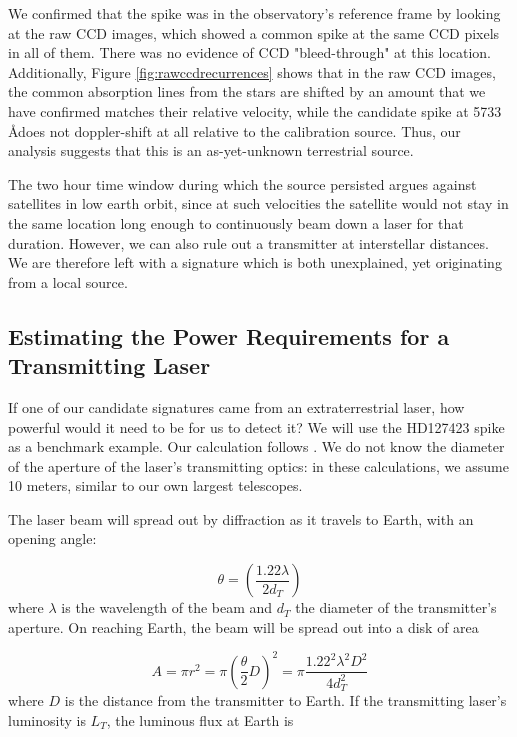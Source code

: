 \documentclass[linenumbers]{aastex631}
\begin{document}
 We confirmed that the spike was in the observatory's reference frame by looking at the raw CCD images, which showed a common spike at the same CCD pixels in all of them.  There was no evidence of CCD "bleed-through" at this location.
Additionally, Figure \ref{fig:rawccdrecurrences} shows that in the raw CCD images, the common absorption lines from the stars are shifted by an amount that we have confirmed matches their relative velocity, while the candidate spike at 5733 \AA does not doppler-shift at all relative to the calibration source. 
 Thus, our analysis suggests that this is an as-yet-unknown terrestrial source.

The two hour time window during which the source persisted argues against satellites in low earth orbit, since at such velocities the satellite would not stay in the same location long enough to continuously beam down a laser for that duration. However, we can also rule out a transmitter at interstellar distances. We are therefore left with a signature which is both unexplained, yet originating from a local source.

\subsection{Estimating the Power Requirements for a Transmitting Laser}
If one of our candidate signatures came from an extraterrestrial laser, how powerful would it need to be for us to detect it?  We will use the HD127423 spike as a benchmark example.  Our calculation follows \cite{Lipman_2019}.  We do not know the diameter of the aperture of the laser’s transmitting optics: in these calculations, we assume 10 meters, similar to our own largest telescopes.

The laser beam will spread out by diffraction as it travels to Earth, with an opening angle:

\begin{equation}
    \theta = (\frac{1.22\lambda}{2d_T})
\end{equation}
where $\lambda$ is the wavelength of the beam and $d_T$ the diameter of the transmitter's aperture.  On reaching Earth, the beam will be spread out into a disk of area

\begin{equation}
    A = \pi r^2 = \pi (\frac{\theta}{2} D)^2 = \pi \frac{1.22^2 \lambda^2 D^2}{4 d_T^2}
\end{equation}
where $D$ is the distance from the transmitter to Earth.  If the transmitting laser's luminosity is $L_T$, the luminous flux at Earth is
\end{document}
